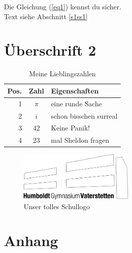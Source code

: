 \documentclass[a4paper,12pt,oneside]{scrartcl}  %
\begin{document}
 Die Gleichung (\vref{eq1}) kennst du sicher.\\[0.5cm]

 {\huge Text} siehe Abschnitt \vref{s1ss1}

 \clearpage
 
 \section{Überschrift 2}\label{s2}
	
 \blindtext
 
 \begin{table}[hb]
   \centering
   \begin{tabular}{r|c|l}
     Pos. & Zahl & Eigenschaften \\\hline
     1 & $\pi$ & eine runde Sache \\
     2 & $i$ & schon bisschen surreal \\
     3 & 42 & Keine Panik! \\
     4 & 23 & mal Sheldon fragen \\
   \end{tabular}\caption{Meine Lieblingszahlen}\label{tab:Lieblingszahlen}
 \end{table}
 
 \blindtext

 \begin{figure}[hbt]
   \centering
   \includegraphics[width=0.5\textwidth]{HGV-logo.png}
   \caption{Unser tolles Schullogo}\label{fig:HGVlogo}
 \end{figure}

 \blindtext
	
 \clearpage	
 \listoffigures

 \clearpage	
 \listoftables

 \clearpage	
	
 \clearpage
 \appendix
 \section*{Anhang}
	
\end{document}

